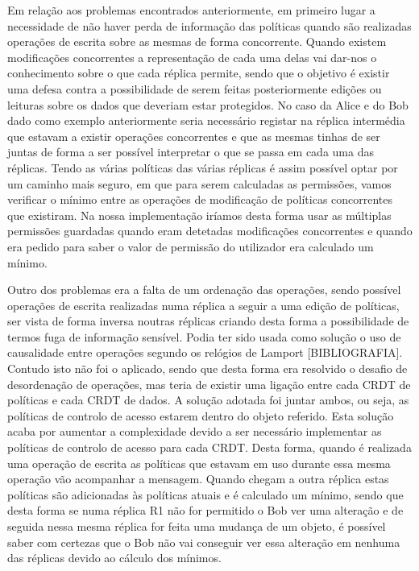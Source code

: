 \documentclass[runningheads,a4paper]{llncs}
\begin{document}
Em relação aos problemas encontrados anteriormente, em primeiro lugar a necessidade de não haver perda de informação das políticas quando são realizadas operações de escrita sobre as mesmas de forma concorrente. Quando existem modificações concorrentes a representação de cada uma delas vai dar-nos o conhecimento sobre o que cada réplica permite, sendo que o objetivo é existir uma defesa contra a possibilidade de serem feitas posteriormente edições ou leituras sobre os dados que deveriam estar protegidos. No caso da Alice e do Bob dado como exemplo anteriormente seria necessário registar na réplica intermédia que estavam a existir operações concorrentes e que as mesmas tinhas de ser juntas de forma a ser possível interpretar o que se passa em cada uma das réplicas. Tendo as várias políticas das várias réplicas é assim possível optar por um caminho mais seguro, em que para serem calculadas as permissões, vamos verificar o mínimo entre as operações de modificação de políticas concorrentes que existiram. Na nossa implementação iríamos desta forma usar as múltiplas permissões guardadas quando eram detetadas modificações concorrentes e quando era pedido para saber o valor de permissão do utilizador era calculado um mínimo.

Outro dos problemas era a falta de um ordenação das operações, sendo possível operações de escrita realizadas numa réplica a seguir a uma edição de políticas, ser vista de forma inversa noutras réplicas criando desta forma a possibilidade de termos fuga de informação sensível. Podia ter sido usada como solução o uso de causalidade entre operações segundo os relógios de Lamport [BIBLIOGRAFIA]. Contudo isto não foi o aplicado, sendo que desta forma era resolvido o desafio de desordenação de operações, mas teria de existir uma ligação entre cada CRDT de políticas e cada CRDT de dados. A solução adotada foi juntar ambos, ou seja, as políticas de controlo de acesso estarem dentro do objeto referido. Esta solução acaba por aumentar a complexidade devido a ser necessário implementar as políticas de controlo de acesso para cada CRDT. Desta forma, quando é realizada uma operação de escrita as políticas que estavam em uso durante essa mesma operação vão acompanhar a mensagem. Quando chegam a outra réplica estas políticas são adicionadas às políticas atuais e é calculado um mínimo, sendo que desta forma se numa réplica R1 não for permitido o Bob ver uma alteração e de seguida nessa mesma réplica for feita uma mudança de um objeto, é possível saber com certezas que o Bob não vai conseguir ver essa alteração em nenhuma das réplicas devido ao cálculo dos mínimos.
\end{document}
